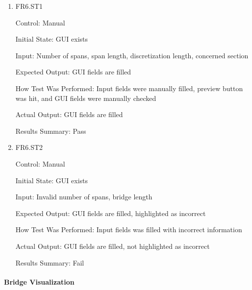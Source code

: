 \documentclass[12pt, titlepage]{article}
\begin{document}
\begin{enumerate}

  \item{FR6.ST1\\}

    Control: Manual
            
    Initial State: GUI exists
                    
    Input: Number of spans, span length, discretization length, concerned section
                    
    Expected Output: GUI fields are filled
    
    How Test Was Performed: Input fields were manually filled, preview
    button was hit, and GUI fields were manually checked
            
    Actual Output: GUI fields are filled
    
    Results Summary: Pass
  
  \item{FR6.ST2\\}
  
  Control: Manual
  
  Initial State: GUI exists
  
  Input: Invalid number of spans, bridge length
  
  Expected Output: GUI fields are filled, highlighted as incorrect
  
  How Test Was Performed: Input fields was filled with incorrect information
  
  Actual Output: GUI fields are filled, not highlighted as incorrect
  
  Results Summary: Fail

\end{enumerate}

\paragraph{Bridge Visualization}
\end{document}

